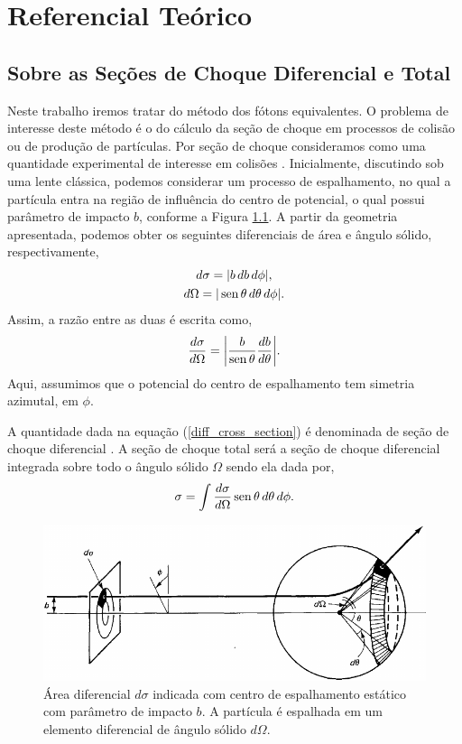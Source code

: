 \chapter{Referencial Teórico}
\section{Sobre as Seções de Choque Diferencial e Total}
Neste trabalho iremos tratar do método dos fótons equivalentes. O problema de
interesse deste método é o do cálculo da seção de choque em processos de
colisão ou de produção de partículas. Por seção de choque consideramos como uma
quantidade experimental de interesse em colisões \cite{griffiths_particle}.
Inicialmente, discutindo sob uma lente clássica, podemos considerar um processo
de espalhamento, no qual a partícula entra na região de influência do centro de
potencial, o qual possui parâmetro de impacto $b$, conforme a Figura
\ref{cross_section_def}. A partir da geometria apresentada, podemos obter os
seguintes diferenciais de área e ângulo sólido, respectivamente,
\begin{gather}
d\sigma = |b\, db\, d\phi|,\\
d\Omega = |\operatorname*{sen} \theta \, d\theta \, d\phi|.
\end{gather}
Assim, a razão entre as duas é escrita como,
\begin{equation}
\frac{d\sigma}{d\Omega} = \bigg| \frac{b}{\operatorname*{sen} \theta} \frac{db}{d\theta}
\bigg|. \label{diff_cross_section}
\end{equation}
Aqui, assumimos que o potencial do centro de espalhamento tem simetria
azimutal, em $\phi$.

A quantidade dada na equação (\ref{diff_cross_section}) é denominada de seção
de choque diferencial \cite{griffiths_particle}.  A seção de choque total
será a seção de choque diferencial integrada sobre todo o ângulo sólido
$\Omega$ sendo ela dada por,
\begin{equation}
\sigma = \int \frac{d\sigma}{d\Omega} \operatorname*{sen} \theta \, d\theta \, d\phi .
\end{equation}

\begin{figure}[h]
\centering
	\captionsetup{width=\textwidth}
	\caption{Área diferencial $d\sigma$ indicada com centro de espalhamento
	estático com parâmetro de impacto $b$. A partícula é espalhada em um
	elemento diferencial de ângulo sólido $d\Omega$.}
\label{cross_section_def}
\includegraphics[width=\textwidth]{./figs/cross_section.jpeg}
\end{figure}

